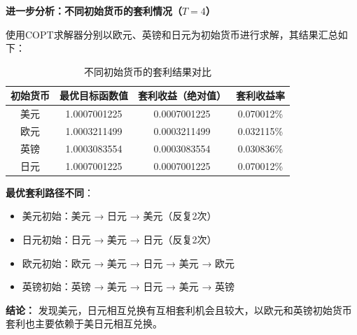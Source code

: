 \documentclass[12pt,a4paper]{article}
\begin{document}
\vspace{0.5cm}

\textbf{进一步分析：不同初始货币的套利情况（}$T=4$\textbf{）}

使用COPT求解器分别以欧元、英镑和日元为初始货币进行求解，其结果汇总如下：

\begin{table}[h]
\centering
\caption{不同初始货币的套利结果对比}
\begin{tabular}{|c|c|c|c|}
\hline
初始货币 & 最优目标函数值 & 套利收益（绝对值） & 套利收益率 \\
\hline
美元 & 1.0007001225 & 0.0007001225 & 0.070012\% \\
欧元 & 1.0003211499 & 0.0003211499 & 0.032115\% \\
英镑 & 1.0003083554 & 0.0003083554 & 0.030836\% \\
日元 & 1.0007001225 & 0.0007001225 & 0.070012\% \\
\hline
\end{tabular}
\end{table}








    \textbf{最优套利路径不同}：
    \begin{itemize}
        \item 美元初始：美元 → 日元 → 美元（反复2次）
        \item 日元初始：日元 → 美元 → 日元（反复2次）
        \item 欧元初始：欧元 → 美元 → 日元 → 美元 → 欧元
        \item 英镑初始：英镑 → 美元 → 日元 → 美元 → 英镑
    \end{itemize}
    

\textbf{结论：}
发现美元，日元相互兑换有互相套利机会且较大，以欧元和英镑初始货币套利也主要依赖于美日元相互兑换。
\end{document}
